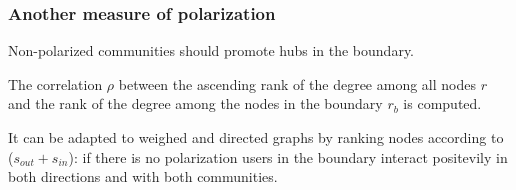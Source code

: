 \documentclass{beamer}
\begin{document}
    \begin{frame}[c]
        \frametitle{Another measure of polarization}
        Non-polarized communities should promote hubs in the boundary. 

        \bigskip

        The correlation $\rho$ between the ascending rank of the degree among all
        nodes $r $ and the rank of the degree among the nodes in the boundary
        $r_{b} $ is computed.

        \bigskip

        It can be adapted to weighed and directed graphs by ranking nodes
        according to ($s _{out} + s_{in} $): if there is no polarization users
        in the boundary interact positevily in both directions and with both
        communities.
    \end{frame}
\end{document}
